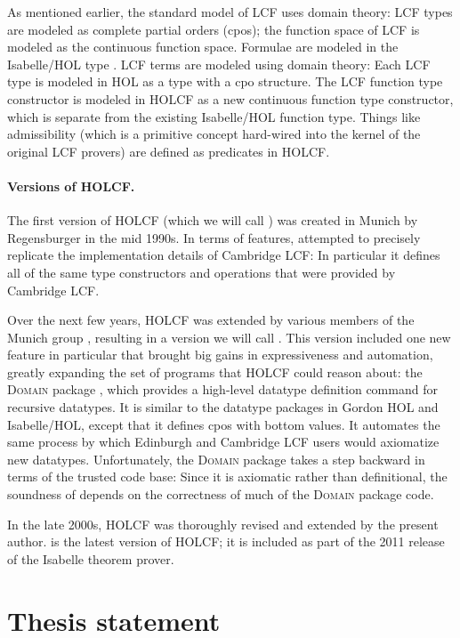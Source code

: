 As mentioned earlier, the standard model of LCF uses domain theory: LCF types are modeled as complete partial orders (cpos); the function space of LCF is modeled as the continuous function space. Formulae are modeled in the Isabelle/HOL type . LCF terms are modeled using domain theory: Each LCF type is modeled in HOL as a type with a cpo structure. The LCF function type constructor is modeled in HOLCF as a new continuous function type constructor, which is separate from the existing Isabelle/HOL function type. Things like admissibility (which is a primitive concept hard-wired into the kernel of the original LCF provers) are defined as predicates in HOLCF.

\paragraph{Versions of HOLCF.}

The first version of HOLCF (which we will call ) was created in Munich by Regensburger \cite{regensburger94thesis, regensburger95holcf} in the mid 1990s. In terms of features,  attempted to precisely replicate the implementation details of Cambridge LCF: In particular it defines all of the same type constructors and operations that were provided by Cambridge LCF.

Over the next few years, HOLCF was extended by various members of the Munich group \cite{hol+lcf}, resulting in a version we will call . This version included one new feature in particular that brought big gains in expressiveness and automation, greatly expanding the set of programs that HOLCF could reason about: the \textsc{Domain} package \cite{Oheimb97}, which provides a high-level datatype definition command for recursive datatypes. It is similar to the datatype packages in Gordon HOL and Isabelle/HOL, except that it defines cpos with bottom values. It automates the same process by which Edinburgh and Cambridge LCF users would axiomatize new datatypes. Unfortunately, the  \textsc{Domain} package takes a step backward in terms of the trusted code base: Since it is axiomatic rather than definitional, the soundness of  depends on the correctness of much of the \textsc{Domain} package code.

In the late 2000s, HOLCF was thoroughly revised and extended by the present author.  is the latest version of HOLCF; it is included as part of the 2011 release of the Isabelle theorem prover.

\section{Thesis statement}
\label{sec:intro-thesis}

